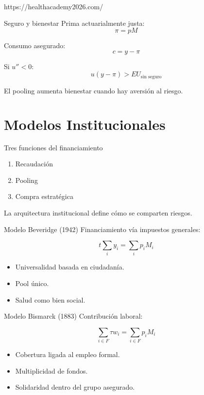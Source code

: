 https://healthacademy2026.com/\documentclass[10pt]{beamer}
\begin{document}
\begin{frame}{Seguro y bienestar}
Prima actuarialmente justa:
\[
\pi = pM
\]

Consumo asegurado:
\[
c = y - \pi
\]

Si $u''<0$:
\[
u(y-\pi) > EU_{\text{sin seguro}}
\]

\bigskip
El pooling aumenta bienestar cuando hay aversión al riesgo.
\end{frame}

\section{Modelos Institucionales}

\begin{frame}{Tres funciones del financiamiento}
\begin{enumerate}
\item Recaudación
\item Pooling
\item Compra estratégica
\end{enumerate}

\bigskip
La arquitectura institucional define cómo se comparten riesgos.
\end{frame}

\begin{frame}{Modelo Beveridge (1942)}
Financiamiento vía impuestos generales:

\[
t \sum_i y_i = \sum_i p_i M_i
\]

\begin{itemize}
\item Universalidad basada en ciudadanía.
\item Pool único.
\item Salud como bien social.
\end{itemize}
\end{frame}

\begin{frame}{Modelo Bismarck (1883)}
Contribución laboral:

\[
\sum_{i \in F} \tau w_i = \sum_{i \in F} p_i M_i
\]

\begin{itemize}
\item Cobertura ligada al empleo formal.
\item Multiplicidad de fondos.
\item Solidaridad dentro del grupo asegurado.
\end{itemize}
\end{frame}
\end{document}
